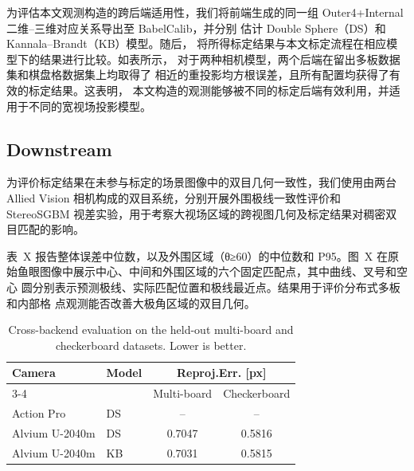 \documentclass[letterpaper, 10 pt, conference]{ieeeconf}  %
\begin{document}
为评估本文观测构造的跨后端适用性，我们将前端生成的同一组
Outer4+Internal 二维--三维对应关系导出至 BabelCalib，并分别
估计 Double Sphere（DS）和 Kannala--Brandt（KB）模型。随后，
将所得标定结果与本文标定流程在相应模型下的结果进行比较。如表所示，
对于两种相机模型，两个后端在留出多板数据集和棋盘格数据集上均取得了
相近的重投影均方根误差，且所有配置均获得了有效的标定结果。这表明，
本文构造的观测能够被不同的标定后端有效利用，并适用于不同的宽视场投影模型。

\subsection{Downstream}

为评价标定结果在未参与标定的场景图像中的双目几何一致性，我们使用由两台 Allied Vision 相机构成的双目系统，分别开展外围极线一致性评价和 StereoSGBM 视差实验，用于考察大视场区域的跨视图几何及标定结果对稠密双目匹配的影响。


表~X 报告整体误差中位数，以及外围区域（θ≥60）的中位数和 P95。图~X 在原
始鱼眼图像中展示中心、中间和外围区域的六个固定匹配点，其中曲线、叉号和空心
圆分别表示预测极线、实际匹配位置和极线最近点。结果用于评价分布式多板和内部格
点观测能否改善大极角区域的双目几何。

\begin{table}[t]
  \centering
  \caption{Cross-backend evaluation on the held-out multi-board and
  checkerboard datasets. Lower is better.}
  \label{tab:cross_backend}
  \small
  \setlength{\tabcolsep}{3.5pt}
  \renewcommand{\arraystretch}{1.08}
  \begin{tabular}{@{}llcc@{}}
    \toprule
    \multirow{2}{*}{Camera}
    & \multirow{2}{*}{Model}
    & \multicolumn{2}{c}{Reproj.Err. [px] } \\
    \cmidrule(lr){3-4}
    & & Multi-board & Checkerboard \\
    \midrule
    Action Pro & DS & -- & -- \\
    Alvium U-2040m & DS & 0.7047 & 0.5816 \\
    Alvium U-2040m & KB & 0.7031 & 0.5815 \\
    \bottomrule
  \end{tabular}
\end{table}
\end{document}
